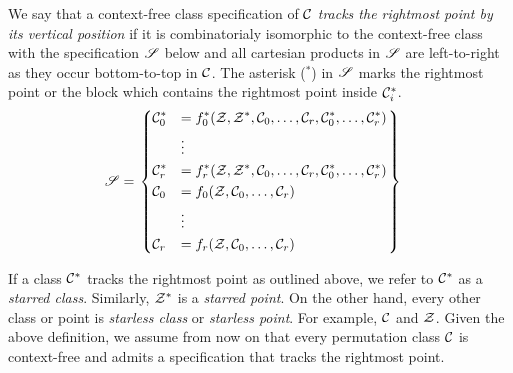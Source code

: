 \message{ !name(thesis.tex)}\documentclass[12pt, a4paper, twoside]{report}
\begin{document}
\begin{definition}
  We say that a context-free class specification of $\mathcal{C}$ \emph{tracks the rightmost point by its vertical position} if it is combinatorialy isomorphic to the context-free class with the specification $\mathscr{S}$ below and all cartesian products in $\mathscr{S}$ are left-to-right as they occur bottom-to-top in $\mathcal{C}$. The asterisk (${}^*$) in $\mathscr{S}$ marks the rightmost point or the block which contains the rightmost point inside $\mathcal{C}_i^*$.
  \begin{align*}
\mathscr{S} &=  \begin{rcases}\begin{dcases}
  \mathcal{C}_0^* &= f_0^*(\mathcal{Z},\mathcal{Z}^*,\mathcal{C}_0,\ldots,\mathcal{C}_r,\mathcal{C}_0^*,\ldots,\mathcal{C}_r^*)\\
       &\vdots\\
  \mathcal{C}_r^* &= f_r^*(\mathcal{Z},\mathcal{Z}^*,\mathcal{C}_0,\ldots,\mathcal{C}_r,\mathcal{C}_0^*,\ldots,\mathcal{C}_r^*)\\
  \mathcal{C}_0 &= f_0(\mathcal{Z},\mathcal{C}_0,\ldots,\mathcal{C}_r)\\
       &\vdots\\
       \mathcal{C}_r &= f_r(\mathcal{Z},\mathcal{C}_0,\ldots,\mathcal{C}_r)
       \end{dcases}
     \end{rcases}
   \end{align*}
\end{definition}
If a class $\mathcal{C}^*$ tracks the rightmost point as outlined above, we refer to $\mathcal{C}^*$ as a \emph{starred class}. Similarly, $\mathcal{Z}^*$ is a \emph{starred point}. On the other hand, every other class or point is \emph{starless class} or \emph{starless point}. For example, $\mathcal{C}$ and $\mathcal{Z}$. Given the above definition, we assume from now on that every permutation class $\mathcal{C}$ is context-free and admits a specification that tracks the rightmost point. 
\end{document}
